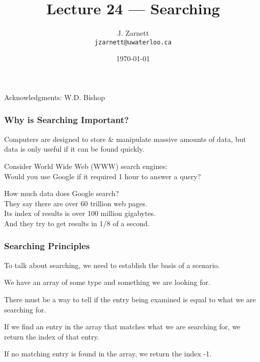 

\title{Lecture 24 --- Searching }

\author{J. Zarnett\\
\texttt{jzarnett@uwaterloo.ca}}
\date{\today}



\begin{frame}
  \titlepage
  
  \begin{center}
  \small{Acknowledgments: W.D. Bishop}
  \end{center}
\end{frame}


\begin{frame}
\frametitle{Why is Searching Important?}

Computers are designed to store \& manipulate massive amounts of data, but data is only useful if it can be found quickly.

Consider World Wide Web (WWW) search engines:\\
\quad Would you use Google if it required 1 hour to answer a query?

How much data does Google search?\\
\quad They say there are over 60 trillion web pages.\\
\quad Its index of results is over 100 million gigabytes.\\
\quad And they try to get results in 1/8 of a second. 
\end{frame}

\begin{frame}
\frametitle{Searching Principles}
To talk about searching, we need to establish the basis of a scenario.

We have an array of some type and something we are looking for.

There must be a way to tell if the entry being examined is equal to what we are searching for.

If we find an entry in the array that matches what we are searching for, we return the index of that entry.

If no matching entry is found in the array, we return the index -1.

\end{frame}


